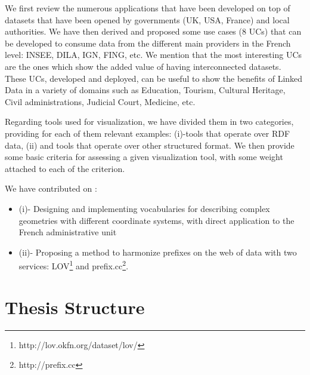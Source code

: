 We first review the numerous applications that have been developed on top of datasets that have been opened by governments (UK, USA, France) and local authorities. We have then derived and proposed some use cases (8 UCs) that can be developed to consume data from the different main providers in the French level: INSEE, DILA, IGN, FING, etc. We mention that the most interesting UCs are the ones which show the added value of having interconnected datasets. These UCs,  developed and deployed, can be useful to show the benefits of Linked Data in a variety of domains such as Education, Tourism, Cultural Heritage, Civil administrations, Judicial Court, Medicine, etc. 

Regarding tools used for visualization, we have divided them in two categories, providing for each of them relevant examples: (i)-tools that operate over RDF data, (ii) and tools that operate over other structured format. We then provide some basic criteria for assessing a given visualization tool, with some weight attached to each of the criterion. 

We have contributed  on : 
\begin{itemize}
\item (i)- Designing and implementing vocabularies for describing complex geometries with different coordinate systems, with direct application to the French administrative unit
\item (ii)- Proposing a method to harmonize prefixes on the web of data  with two services: LOV\footnote{http://lov.okfn.org/dataset/lov/} and prefix.cc\footnote{http://prefix.cc}. 
\end{itemize}

\section{Thesis Structure}
\label{sec:thesis-structure}